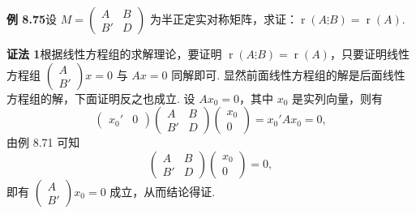\documentclass[UTF8,12pt,a4paper,fontset=fandol]{ctexart}
\begin{document}
\noindent\textbf{例 8.75}\quad 设 $M=\left(\begin{array}{cc}A&B\\ B'&D\end{array}\right)$ 为半正定实对称矩阵，求证：$\operatorname{r}(A\vdots B)=\operatorname{r}(A)$.

\noindent\textbf{证法 1}\quad 根据线性方程组的求解理论，要证明 $\operatorname{r}(A\vdots B)=\operatorname{r}(A)$，只要证明线性方程组 $\left(\begin{array}{c}A\\ B'\end{array}\right)x=0$ 与 $Ax=0$ 同解即可. 显然前面线性方程组的解是后面线性方程组的解，下面证明反之也成立. 设 $Ax_0=0$，其中 $x_0$ 是实列向量，则有
\[
\left(\begin{array}{cc}x_0'&0\end{array}\right)
\left(\begin{array}{cc}
A & B\\
B' & D
\end{array}\right)
\left(\begin{array}{c}
x_0\\
0
\end{array}\right)=x_0'Ax_0=0,
\]
由例 8.71 可知
\[
\left(\begin{array}{cc}
A & B\\
B' & D
\end{array}\right)
\left(\begin{array}{c}
x_0\\
0
\end{array}\right)=0,
\]
即有 $\left(\begin{array}{c}A\\ B'\end{array}\right)x_0=0$ 成立，从而结论得证.
\end{document}
